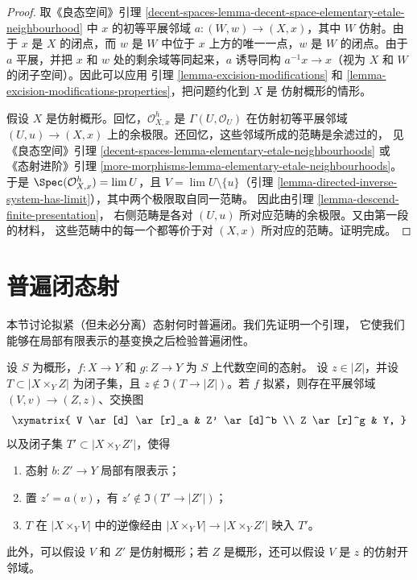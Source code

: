 \begin{proof}
取《良态空间》引理
\ref{decent-spaces-lemma-decent-space-elementary-etale-neighbourhood} 中
$x$ 的初等平展邻域 $a : (W, w) \to (X, x)$，其中 $W$ 仿射。由于 $x$
是 $X$ 的闭点，而 $w$ 是 $W$ 中位于 $x$ 上方的唯一一点，$w$ 是 $W$
的闭点。由于 $a$ 平展，并把 $x$ 和 $w$ 处的剩余域等同起来，$a$
诱导同构 $a^{-1}x \to x$（视为 $X$ 和 $W$ 的闭子空间）。因此可以应用
引理 \ref{lemma-excision-modifications} 和
\ref{lemma-excision-modifications-properties}，把问题约化到 $X$ 是
仿射概形的情形。

\medskip\noindent
假设 $X$ 是仿射概形。回忆，$\mathcal{O}_{X, x}^h$ 是
$\Gamma(U, \mathcal{O}_U)$ 在仿射初等平展邻域
$(U, u) \to (X, x)$ 上的余极限。还回忆，这些邻域所成的范畴是余滤过的，
见《良态空间》引理
\ref{decent-spaces-lemma-elementary-etale-neighbourhoods} 或《态射进阶》引理
\ref{more-morphisms-lemma-elementary-etale-neighbourhoods}。于是
$\Spec(\mathcal{O}_{X, x}^h) = \lim U$，且
$V = \lim U \setminus \{u\}$（引理
\ref{lemma-directed-inverse-system-has-limit}），其中两个极限取自同一范畴。
因此由引理 \ref{lemma-descend-finite-presentation}，
右侧范畴是各对 $(U, u)$ 所对应范畴的余极限。又由第一段的材料，
这些范畴中的每一个都等价于对 $(X, x)$ 所对应的范畴。证明完成。
\end{proof}






\section{普遍闭态射}
\label{section-universally-closed}

\noindent
本节讨论拟紧（但未必分离）态射何时普遍闭。我们先证明一个引理，
它使我们能够在局部有限表示的基变换之后检验普遍闭性。

\begin{lemma}
\label{lemma-separate}
设 $S$ 为概形，$f : X \to Y$ 和 $g : Z \to Y$ 为 $S$ 上代数空间的态射。
设 $z \in |Z|$，并设 $T \subset |X \times_Y Z|$ 为闭子集，且
$z \not \in \Im(T \to |Z|)$。若 $f$ 拟紧，则存在平展邻域
$(V, v) \to (Z, z)$、交换图
$$
\xymatrix{
V \ar[d] \ar[r]_a & Z' \ar[d]^b \\
Z \ar[r]^g & Y,
}
$$
以及闭子集 $T' \subset |X \times_Y Z'|$，使得
\begin{enumerate}
\item 态射 $b : Z' \to Y$ 局部有限表示；
\item 置 $z' = a(v)$，有 $z' \not \in \Im(T' \to |Z'|)$；
\item $T$ 在 $|X \times_Y V|$ 中的逆像经由
$|X \times_Y V| \to |X \times_Y Z'|$ 映入 $T'$。
\end{enumerate}
此外，可以假设 $V$ 和 $Z'$ 是仿射概形；若 $Z$ 是概形，还可以假设
$V$ 是 $z$ 的仿射开邻域。
\end{lemma}


